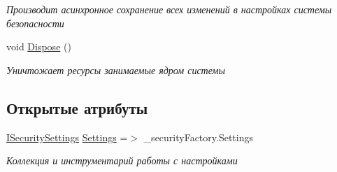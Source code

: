 \begin{DoxyCompactItemize}
\begin{DoxyCompactList}\small\item\em Производит асинхронное сохранение всех изменений в настройках системы безопасности \end{DoxyCompactList}\item 
void \hyperlink{class_security_1_1_core_security_ae04c044fdd2706f7002c94da9924c2eb}{Dispose} ()
\begin{DoxyCompactList}\small\item\em Уничтожает ресурсы занимаемые ядром системы \end{DoxyCompactList}\end{DoxyCompactItemize}
\subsection*{Открытые атрибуты}
\begin{DoxyCompactItemize}
\item 
\hyperlink{interface_security_1_1_interfaces_1_1_i_security_settings}{I\+Security\+Settings} \hyperlink{class_security_1_1_core_security_a93562c3f6277d8462f88e25d8c6b097d}{Settings} =$>$ \+\_\+security\+Factory.\+Settings
\begin{DoxyCompactList}\small\item\em Коллекция и инструментарий работы с настройками \end{DoxyCompactList}\end{DoxyCompactItemize}
